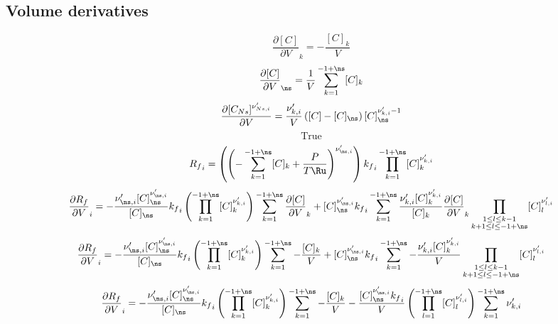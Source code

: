 \documentclass[a4paper,10pt]{article}
\begin{document}
\subsection{Volume derivatives}
\begin{dmath} \frac{\partial [C] }{\partial V }_{k} = - \frac{[C]_{k}}{V}\end{dmath} 
\begin{dmath} \frac{\partial [C] }{\partial V }_{\ns} = \frac{1}{V} \sum_{k=1}^{-1 + \ns} [C]_{k}\end{dmath} 
\begin{dmath} \frac{\partial [C_{Ns}]^{\nu^{\prime}_{Ns, i}}}{\partial V } = \frac{\nu^{\prime}_{k,i}}{V} \left([C] - [C]_{\ns}\right) [C]_{\ns}^{\nu^{\prime}_{k,i} - 1}\end{dmath} 
\begin{dmath} \mathrm{True}\end{dmath} 
\begin{dmath} {R_f}_{i} = \left(\left(- \sum_{k=1}^{-1 + \ns} [C]_{k} + \frac{P}{T \Ru}\right)^{\nu^{\prime}_{\ns,i}}\right) {k_f}_{i} \prod_{k=1}^{-1 + \ns} [C]_{k}^{\nu^{\prime}_{k,i}}\end{dmath} 
\begin{dmath} \frac{\partial {R_f} }{\partial V }_{i} = - \frac{\nu^{\prime}_{\ns,i} [C]_{\ns}^{\nu^{\prime}_{\ns,i}}}{[C]_{\ns}} {k_f}_{i} \left(\prod_{k=1}^{-1 + \ns} [C]_{k}^{\nu^{\prime}_{k,i}}\right) \sum_{k=1}^{-1 + \ns} \frac{\partial [C] }{\partial V }_{k} + [C]_{\ns}^{\nu^{\prime}_{\ns,i}} {k_f}_{i} \sum_{k=1}^{-1 + \ns} \frac{\nu^{\prime}_{k,i} [C]_{k}^{\nu^{\prime}_{k,i}}}{[C]_{k}} \frac{\partial [C] }{\partial V }_{k} \prod_{\substack{1 \leq l \leq k - 1\\k + 1 \leq l \leq -1 + \ns}} [C]_{l}^{\nu^{\prime}_{l,i}}\end{dmath} 
\begin{dmath} \frac{\partial {R_f} }{\partial V }_{i} = - \frac{\nu^{\prime}_{\ns,i} [C]_{\ns}^{\nu^{\prime}_{\ns,i}}}{[C]_{\ns}} {k_f}_{i} \left(\prod_{k=1}^{-1 + \ns} [C]_{k}^{\nu^{\prime}_{k,i}}\right) \sum_{k=1}^{-1 + \ns} - \frac{[C]_{k}}{V} + [C]_{\ns}^{\nu^{\prime}_{\ns,i}} {k_f}_{i} \sum_{k=1}^{-1 + \ns} - \frac{\nu^{\prime}_{k,i} [C]_{k}^{\nu^{\prime}_{k,i}}}{V} \prod_{\substack{1 \leq l \leq k - 1\\k + 1 \leq l \leq -1 + \ns}} [C]_{l}^{\nu^{\prime}_{l,i}}\end{dmath} 
\begin{dmath} \frac{\partial {R_f} }{\partial V }_{i} = - \frac{\nu^{\prime}_{\ns,i} [C]_{\ns}^{\nu^{\prime}_{\ns,i}}}{[C]_{\ns}} {k_f}_{i} \left(\prod_{k=1}^{-1 + \ns} [C]_{k}^{\nu^{\prime}_{k,i}}\right) \sum_{k=1}^{-1 + \ns} - \frac{[C]_{k}}{V} - \frac{[C]_{\ns}^{\nu^{\prime}_{\ns,i}} {k_f}_{i}}{V} \left(\prod_{l=1}^{-1 + \ns} [C]_{l}^{\nu^{\prime}_{l,i}}\right) \sum_{k=1}^{-1 + \ns} \nu^{\prime}_{k,i}\end{dmath} 
\end{document}
